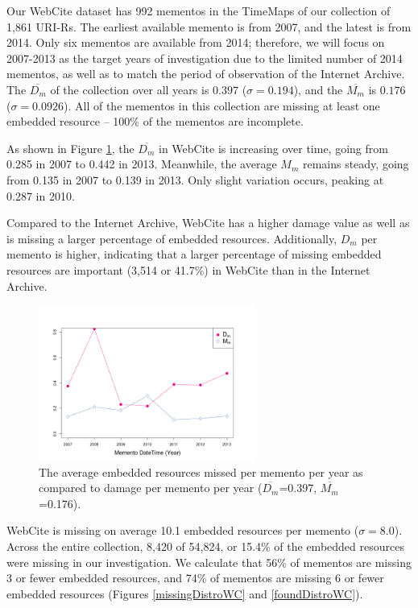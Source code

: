 Our WebCite dataset has 992 mementos in the TimeMaps of our collection of 1,861 URI-Rs. The earliest available memento is from 2007, and the latest is from 2014. Only six mementos are available from 2014; therefore, we will focus on 2007-2013 as the target years of investigation due to the limited number of 2014 mementos, as well as to match the period of observation of the Internet Archive. The $\overline{D_m}$ of the collection over all years is $0.397$ ($\sigma=0.194$), and the $\overline{M_m}$ is $0.176$ ($\sigma=0.0926$). All of the mementos in this collection are missing at least one embedded resource -- 100\% of the mementos are incomplete. 

As shown in Figure \ref{missingByYearWC}, the $\overline{D_m}$ in WebCite is increasing over time, going from 0.285 in 2007 to 0.442 in 2013. Meanwhile, the average $M_m$ remains steady, going from 0.135 in 2007 to 0.139 in 2013. Only slight variation occurs, peaking at 0.287 in 2010. 

Compared to the Internet Archive, WebCite has a higher damage value as well as is missing a larger percentage of embedded resources. Additionally, $D_m$ per memento is higher, indicating that a larger percentage of missing embedded resources are important (3,514 or 41.7\%) in WebCite than in the Internet Archive.

\begin{figure}[h!]
\includegraphics[width=270px]{./imgs/MissedAndDamagePerYear_webcite.png}
\caption{The average embedded resources missed per memento per year as compared to damage per memento per year ($\overline{D_m}$=0.397, $\overline{M_m}$=0.176).}
\label{missingByYearWC}
\end{figure}

WebCite is missing on average 10.1 embedded resources per memento ($\sigma=8.0$). Across the entire collection, 8,420 of 54,824, or 15.4\% of the embedded resources were missing in our investigation. We calculate that 56\% of mementos are missing 3 or fewer embedded resources, and 74\% of mementos are missing 6 or fewer embedded resources (Figures \ref{missingDistroWC} and \ref{foundDistroWC}).

